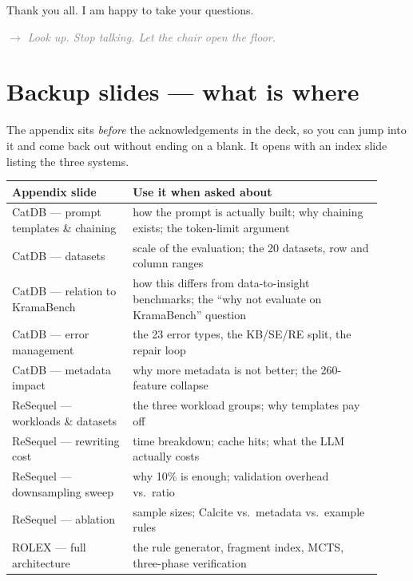 \documentclass[11pt]{article}
\newcommand{\cue}[1]{\par\vspace{1.2mm}\noindent%
  \textit{\small\textcolor{gray}{$\rightarrow$ #1}}\par}
\begin{document}
Thank you all. I am happy to take your questions.
\cue{Look up. Stop talking. Let the chair open the floor.}

\newpage
\section*{Backup slides — what is where}

\noindent The appendix sits \emph{before} the acknowledgements in the deck, so
you can jump into it and come back out without ending on a blank. It opens with
an index slide listing the three systems.

\begin{center}\small
\begin{tabular}{p{0.30\linewidth}p{0.62\linewidth}}
\toprule
\textbf{Appendix slide} & \textbf{Use it when asked about}\\
\midrule
CatDB --- prompt templates \& chaining
 & how the prompt is actually built; why chaining exists; the token-limit
   argument\\
CatDB --- datasets
 & scale of the evaluation; the 20 datasets, row and column ranges\\
CatDB --- relation to KramaBench
 & how this differs from data-to-insight benchmarks; the ``why not evaluate on
   KramaBench'' question\\
CatDB --- error management
 & the 23 error types, the KB/SE/RE split, the repair loop\\
CatDB --- metadata impact
 & why more metadata is not better; the 260-feature collapse\\
ReSequel --- workloads \& datasets
 & the three workload groups; why templates pay off\\
ReSequel --- rewriting cost
 & time breakdown; cache hits; what the LLM actually costs\\
ReSequel --- downsampling sweep
 & why 10\% is enough; validation overhead vs.\ ratio\\
ReSequel --- ablation
 & sample sizes; Calcite vs.\ metadata vs.\ example rules\\
ROLEX --- full architecture
 & the rule generator, fragment index, MCTS, three-phase verification\\
\bottomrule
\end{tabular}
\end{center}

\end{document}

